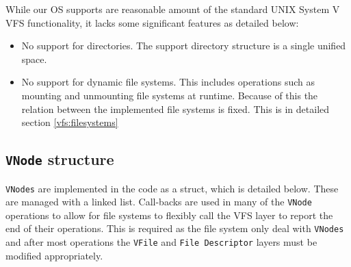 \documentclass[12pt,english]{article}
\begin{document}
While our OS supports are reasonable amount of the standard UNIX System V VFS functionality, it lacks some significant features as detailed below:
\begin{itemize}
\item No support for directories. The support directory structure is a single unified space.
\item No support for dynamic file systems. This includes operations such as mounting and unmounting file systems at runtime. Because of this the relation between the implemented file systems is fixed. This is in detailed section \ref{vfs:filesystems}
\end{itemize}

\subsection{\texttt{VNode} structure} \label{vfs:vnode_struct}

\texttt{VNodes} are implemented in the code as a struct, which is detailed below. These are managed with a linked list. Call-backs are used in many of the \texttt{VNode} operations to allow for file systems to flexibly call the VFS layer to report the end of their operations. This is required as the file system only deal with \texttt{VNodes} and after most operations the \texttt{VFile} and \texttt{File Descriptor} layers must be modified appropriately.
\end{document}
